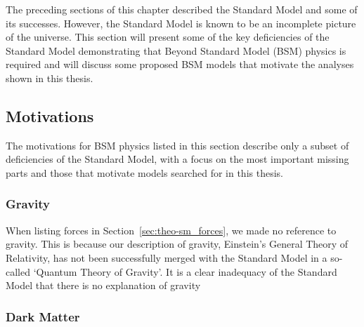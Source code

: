 The preceding sections of this chapter described the Standard Model and some of its successes.
However, the Standard Model is known to be an incomplete picture of the universe.
This section will present some of the key deficiencies of the Standard Model demonstrating that Beyond Standard Model (BSM) physics is required
and will discuss some proposed BSM models that motivate the analyses shown in this thesis.

\subsection{Motivations}

The motivations for BSM physics listed in this section
describe only a subset of deficiencies of the Standard Model,
with a focus on the most important missing parts and
those that motivate models searched for in this thesis.

\subsubsection{Gravity}

When listing forces in Section~\ref{sec:theo-sm_forces}, we made no reference to gravity.
This is because our description of gravity, Einstein's General Theory of Relativity,
has not been successfully merged with the Standard Model in a so-called `Quantum Theory of Gravity'.
It is a clear inadequacy of the Standard Model that there is no explanation of gravity

\subsubsection{Dark Matter}
\label{sec:theo_bsm_dm}


